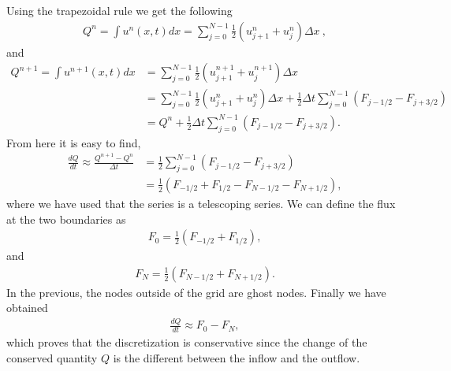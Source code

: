 \begin{questions}


\begin{solution}

Using the trapezoidal rule we get the following
\begin{align*}
Q^n = \int u^n(x,t)dx = \sum_{j=0}^{N-1} \frac{1}{2}\left(u^n_{j+1}+u^n_j\right)\Delta x~,
\end{align*}
and
\begin{align*}
Q^{n+1} = \int u^{n+1}(x,t)dx &= \sum_{j=0}^{N-1} \frac{1}{2}\left(u^{n+1}_{j+1}+u^{n+1}_j\right)\Delta x\\
&=\sum_{j=0}^{N-1} \frac{1}{2}\left(u^n_{j+1}+u^n_j\right)\Delta x+\frac{1}{2}\Delta t \sum_{j=0}^{N-1}\left(F_{j-1/2}-F_{j+3/2}\right)\\
&= Q^n +\frac{1}{2}\Delta t \sum_{j=0}^{N-1}\left(F_{j-1/2}-F_{j+3/2}\right).
\end{align*}
From here it is easy to find,
\begin{align*}
\frac{dQ}{dt} \approx \frac{Q^{n+1}-Q^n}{\Delta t} &= \frac{1}{2} \sum_{j=0}^{N-1}\left(F_{j-1/2}-F_{j+3/2}\right) \\
& = \frac{1}{2}\left(F_{-1/2}+F_{1/2}-F_{N-1/2}-F_{N+1/2}\right),
\end{align*}
where we have used that the series is a telescoping series.
We can define the flux at the two boundaries as
\begin{align*}
F_0 = \frac{1}{2}\left( F_{-1/2}+F_{1/2}\right),
\end{align*}
and
\begin{align*}
F_N = \frac{1}{2}\left( F_{N-1/2}+F_{N+1/2}\right).
\end{align*}
In the previous, the nodes outside of the grid are ghost nodes. Finally we have obtained
\begin{align*}
\frac{dQ}{dt} \approx F_0-F_N,
\end{align*}
which proves that the discretization is conservative since the change of the conserved quantity $Q$ is the different between the inflow and the outflow.


\end{solution}
\end{questions}
